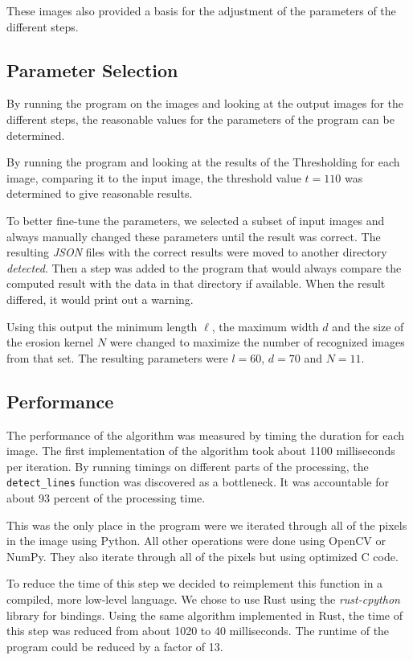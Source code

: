 \documentclass[serif,article,noparskip]{agse-thesis}
\begin{document}
These images also provided a basis for the adjustment of the parameters of the
different steps.

\subsection{Parameter Selection} \label{parameter}

By running the program on the images and looking at the output images for the
different steps, the reasonable values for the parameters of the program can be
determined.

By running the program and looking at the results of the Thresholding for each
image, comparing it to the input image, the threshold value $t = 110$ was
determined to give reasonable results.

To better fine-tune the parameters, we selected a subset of input images and
always manually changed these parameters until the result was correct. The
resulting \textit{JSON} files with the correct results were moved to another
directory \textit{detected}. Then a step was added to the program that would
always compare the computed result with the data in that directory if available.
When the result differed, it would print out a warning.

Using this output the minimum length $\ell$, the maximum width $d$ and the size of
the erosion kernel $N$ were changed to maximize the number of recognized images
from that set. The resulting parameters were $l = 60$, $d = 70$ and $N =11$.


\subsection{Performance} \label{performance}

The performance of the algorithm was measured by timing the duration for each
image. The first implementation of the algorithm took about 1100 milliseconds per
iteration. By running timings on different parts of the processing, the
\texttt{detect\_lines} function was discovered as a bottleneck. It was
accountable for about 93 percent of the processing time.

This was the only place in the program were we iterated through all of the pixels
in the image using Python. All other operations were done using OpenCV or NumPy.
They also iterate through all of the pixels but using optimized C code.

To reduce the time of this step we decided to reimplement this function in a
compiled, more low-level language. We chose to use Rust using the \textit{rust-cpython}
library for bindings. Using the same algorithm implemented in Rust, the time of
this step was reduced from about 1020 to 40 milliseconds. The runtime of the
program could be reduced by a factor of 13.
\end{document}
